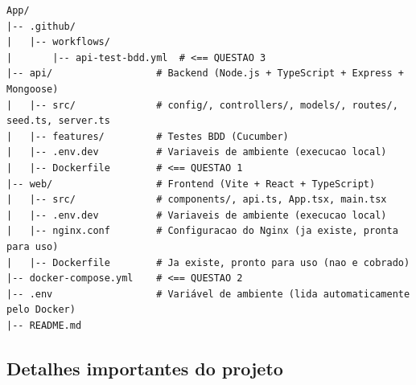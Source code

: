 \begin{lstlisting}
App/
|-- .github/
|   |-- workflows/
|       |-- api-test-bdd.yml  # <== QUESTAO 3
|-- api/                  # Backend (Node.js + TypeScript + Express + Mongoose)
|   |-- src/              # config/, controllers/, models/, routes/, seed.ts, server.ts
|   |-- features/         # Testes BDD (Cucumber)
|   |-- .env.dev          # Variaveis de ambiente (execucao local)
|   |-- Dockerfile        # <== QUESTAO 1
|-- web/                  # Frontend (Vite + React + TypeScript)
|   |-- src/              # components/, api.ts, App.tsx, main.tsx
|   |-- .env.dev          # Variaveis de ambiente (execucao local)
|   |-- nginx.conf        # Configuracao do Nginx (ja existe, pronta para uso)
|   |-- Dockerfile        # Ja existe, pronto para uso (nao e cobrado)
|-- docker-compose.yml    # <== QUESTAO 2
|-- .env                  # Variável de ambiente (lida automaticamente pelo Docker)
|-- README.md
\end{lstlisting}

\subsection*{Detalhes importantes do projeto}

